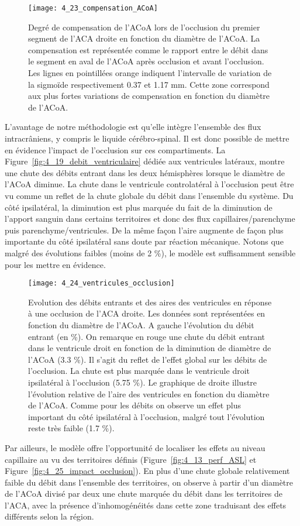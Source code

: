 \begin{figure}[!t]
\centering
\texttt{[image: 4\_23\_compensation\_ACoA]}
\caption{ Degré de compensation de l'ACoA lors de l'occlusion du premier segment de l'ACA droite en fonction du diamètre
de l'ACoA. La compensation est représentée comme le rapport entre le débit dans le segment en aval de l’ACoA après
occlusion et avant l’occlusion. Les lignes en pointillées orange indiquent l’intervalle de variation de la sigmoïde
respectivement 0.37 et 1.17 mm. Cette zone correspond aux plus fortes variations de compensation en fonction du diamètre
de l’ACoA.}
\label{fig:4_23_compensation_ACoA}	
\end{figure}
L’avantage de notre méthodologie est qu’elle intègre l’ensemble des flux intracrâniens, y
compris le liquide cérébro-spinal. Il est donc possible de mettre en évidence l’impact de l’occlusion sur
ces compartiments. La Figure~\ref{fig:4_19_debit_ventriculaire} dédiée aux ventricules latéraux, montre une chute des débits entrant
dans les deux hémisphères lorsque le diamètre de l’ACoA diminue. La chute dans le ventricule
controlatéral à l’occlusion peut être vu comme un reflet de la chute globale du débit dans l’ensemble
du système. Du côté ipsilatéral, la diminution est plus marquée du fait de la diminution de l’apport
sanguin dans certains territoires et donc des flux capillaires/parenchyme puis parenchyme/ventricules.
De la même façon l’aire augmente de façon plus importante du côté ipsilatéral sans doute par réaction
mécanique. Notons que malgré des évolutions faibles (moins de 2 \%), le modèle est suffisamment
sensible pour les mettre en évidence.

\begin{figure}[!t]
\centering
\texttt{[image: 4\_24\_ventricules\_occlusion]}
\caption{ Evolution des débits entrants et des aires des ventricules en réponse à une occlusion de l'ACA droite. Les données
sont représentées en fonction du diamètre de l'ACoA. A gauche l’évolution du débit entrant (en \%). On remarque en rouge
une chute du débit entrant dans le ventricule droit en fonction de la diminution de diamètre de l’ACoA (3.3 \%). Il s’agit du
reflet de l’effet global sur les débits de l’occlusion. La chute est plus marquée dans le ventricule droit ipsilatéral à l’occlusion
(5.75 \%). Le graphique de droite illustre l’évolution relative de l’aire des ventricules en fonction du diamètre de l’ACoA.
Comme pour les débits on observe un effet plus important du côté ipsilatéral à l’occlusion, malgré tout l’évolution reste très
faible (1.7 \%).}
\label{fig:4_24_occlusion_ventricule}	
\end{figure}
Par ailleurs, le modèle offre l’opportunité de localiser les effets au niveau capillaire au vu des
territoires définis (Figure~\ref{fig:4_13_perf_ASL} et Figure~\ref{fig:4_25_impact_occlusion}). En plus d’une chute globale relativement faible du débit
dans l’ensemble des territoires, on observe à partir d’un diamètre de l’ACoA divisé par deux une chute
marquée du débit dans les territoires de l’ACA, avec la présence d’inhomogénéités dans cette zone
traduisant des effets différents selon la région.

